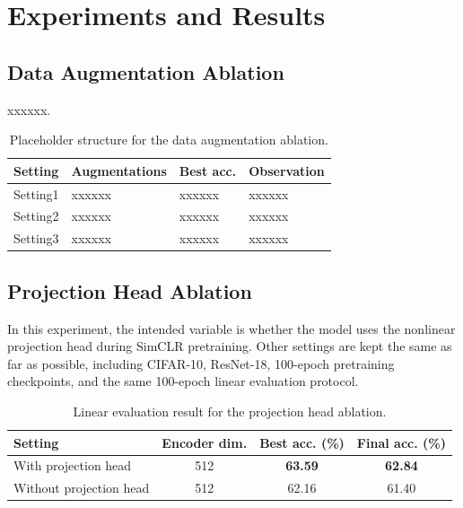 \documentclass[10pt]{article}
\begin{document}
\section{Experiments and Results}

\subsection{Data Augmentation Ablation}

xxxxxx.

\begin{table}[H]
\centering
\small
\begin{tabular}{llll}
\toprule
\textbf{Setting} & \textbf{Augmentations} & \textbf{Best acc.} & \textbf{Observation} \\
\midrule
Setting1 & xxxxxx & xxxxxx & xxxxxx \\
Setting2 & xxxxxx & xxxxxx & xxxxxx \\
Setting3 & xxxxxx & xxxxxx & xxxxxx \\
\bottomrule
\end{tabular}
\caption{Placeholder structure for the data augmentation ablation.}
\label{tab:augmentation-placeholder}
\end{table}

\subsection{Projection Head Ablation}

In this experiment, the intended variable is whether the model uses the nonlinear projection head during SimCLR pretraining. Other settings are kept the same as far as possible, including CIFAR-10, ResNet-18, 100-epoch pretraining checkpoints, and the same 100-epoch linear evaluation protocol.

\begin{table}[H]
\centering
\small
\begin{tabular}{lccc}
\toprule
\textbf{Setting} & \textbf{Encoder dim.} & \textbf{Best acc. (\%)} & \textbf{Final acc. (\%)} \\
\midrule
With projection head & 512 & \textbf{63.59} & \textbf{62.84} \\
Without projection head & 512 & 62.16 & 61.40 \\
\bottomrule
\end{tabular}
\caption{Linear evaluation result for the projection head ablation.}
\label{tab:projection-head}
\end{table}
\end{document}
